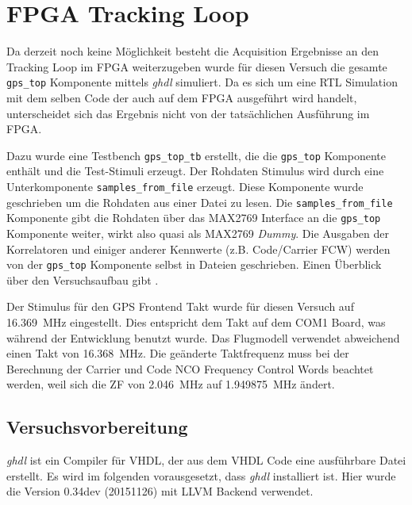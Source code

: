 \section{FPGA Tracking Loop}
Da derzeit noch keine Möglichkeit besteht die Acquisition Ergebnisse an den Tracking Loop im FPGA weiterzugeben wurde für diesen Versuch die gesamte \lstinline$gps_top$ Komponente mittels \emph{ghdl} simuliert. Da es sich um eine \gls{RTL} Simulation mit dem selben Code der auch auf dem FPGA ausgeführt wird handelt, unterscheidet sich das Ergebnis nicht von der tatsächlichen Ausführung im FPGA.

Dazu wurde eine Testbench \lstinline$gps_top_tb$ erstellt, die die \lstinline$gps_top$ Komponente enthält und die Test-Stimuli erzeugt. Der Rohdaten Stimulus wird durch eine Unterkomponente \lstinline$samples_from_file$ erzeugt. Diese Komponente wurde geschrieben um die Rohdaten aus einer Datei zu lesen. Die \lstinline$samples_from_file$ Komponente gibt die Rohdaten über das MAX2769 Interface an die \lstinline$gps_top$ Komponente weiter, wirkt also quasi als MAX2769 \emph{Dummy}. Die Ausgaben der Korrelatoren und einiger anderer Kennwerte (z.B. Code/Carrier FCW) werden von der \lstinline$gps_top$ Komponente selbst in Dateien geschrieben. Einen Überblick über den Versuchsaufbau gibt .

Der Stimulus für den GPS Frontend Takt wurde für diesen Versuch auf \SI{16.369}{MHz} eingestellt. Dies entspricht dem Takt auf dem COM1 Board, was während der Entwicklung benutzt wurde. Das Flugmodell verwendet abweichend einen Takt von \SI{16.368}{MHz}. Die geänderte Taktfrequenz muss bei der Berechnung der Carrier und Code NCO Frequency Control Words beachtet werden, weil sich die ZF von \SI{2.046}{\mega\hertz} auf \SI{1.949875}{\mega\hertz} ändert.


\subsection{Versuchsvorbereitung}
\emph{ghdl} ist ein Compiler für VHDL, der aus dem VHDL Code eine ausführbare Datei erstellt. Es wird im folgenden vorausgesetzt, dass \emph{ghdl} installiert ist. Hier wurde die Version 0.34dev (20151126) mit LLVM Backend verwendet.

